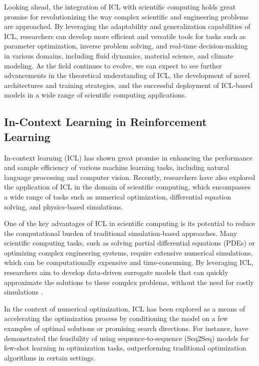 \documentclass[11pt]{article}
\begin{document}
Looking ahead, the integration of ICL with scientific computing holds great promise for revolutionizing the way complex scientific and engineering problems are approached. By leveraging the adaptability and generalization capabilities of ICL, researchers can develop more efficient and versatile tools for tasks such as parameter optimization, inverse problem solving, and real-time decision-making in various domains, including fluid dynamics, material science, and climate modeling. As the field continues to evolve, we can expect to see further advancements in the theoretical understanding of ICL, the development of novel architectures and training strategies, and the successful deployment of ICL-based models in a wide range of scientific computing applications.

\subsection{In-Context Learning in Reinforcement Learning}

In-context learning (ICL) has shown great promise in enhancing the performance and sample efficiency of various machine learning tasks, including natural language processing and computer vision. Recently, researchers have also explored the application of ICL in the domain of scientific computing, which encompasses a wide range of tasks such as numerical optimization, differential equation solving, and physics-based simulations.

One of the key advantages of ICL in scientific computing is its potential to reduce the computational burden of traditional simulation-based approaches. Many scientific computing tasks, such as solving partial differential equations (PDEs) or optimizing complex engineering systems, require extensive numerical simulations, which can be computationally expensive and time-consuming. By leveraging ICL, researchers aim to develop data-driven surrogate models that can quickly approximate the solutions to these complex problems, without the need for costly simulations \cite{ref262}.

In the context of numerical optimization, ICL has been explored as a means of accelerating the optimization process by conditioning the model on a few examples of optimal solutions or promising search directions. For instance, \cite{ref32} have demonstrated the feasibility of using sequence-to-sequence (Seq2Seq) models for few-shot learning in optimization tasks, outperforming traditional optimization algorithms in certain settings.
\end{document}
